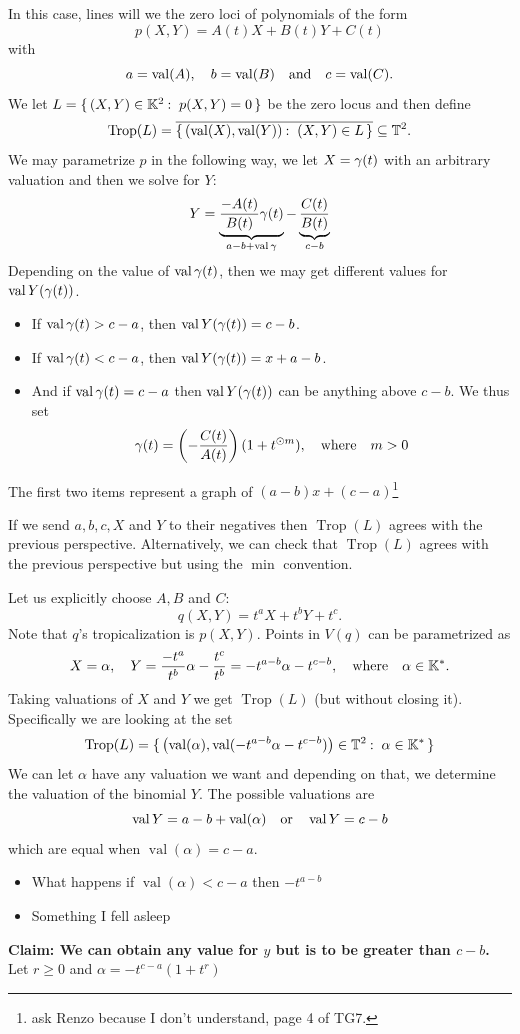 \documentclass[12pt]{memoir}
\DeclareMathOperator{\val}{val}
\DeclareMathOperator{\Trop}{Trop}
\theoremstyle{definition}
\def\al{\alpha}
\begin{document}
In this case, lines will we the zero loci of polynomials of the form 
$$p(X,Y)=A(t)X+B(t)Y+C(t)$$
with 
$$a=\val(A),\quad b=\val(B)\word{and}c=\val(C).$$
We let $L=\set{(X,Y)\in\bK^2\:\ p(X,Y)=0}$ be the zero locus and then define
$$\Trop(L)=\ov{\set{(\val(X),\val(Y))\:\ (X,Y)\in L}}\subseteq\bT^2.$$
We may parametrize $p$ in the following way, we let $X=\gamma(t)$ with an arbitrary valuation and then we solve for $Y$:
$$Y=\underbrace{\frac{-A(t)}{B(t)}\ga(t)}_{a-b+\val\ga}-\underbrace{\frac{C(t)}{B(t)}}_{c-b}$$ 
 Depending on the value of $\val\ga(t)$, then we may get different values for $\val Y(\ga(t))$. 
\begin{itemize}
    \itemsep=-0.4em 
    \item If $\val\ga(t)>c-a$, then $\val Y(\ga(t))=c-b$.
    \item If $\val\ga(t)<c-a$, then $\val Y(\ga(t))=x+a-b$.
    \item And if $\val\ga(t)=c-a$ then $\val Y(\ga(t))$ can be anything above $c-b$. We thus set 
    $$\gamma(t)=\left(-\frac{C(t)}{A(t)}\right)(1+t^{\odot m}),\quad\text{where}\quad m>0$$
\end{itemize}
The first two items represent a graph of $(a-b)x+(c-a)$\footnote{ask Renzo because I don't understand, page 4 of TG7.}
\begin{Rmk}
If we send $a,b,c,X$ and $Y$ to their negatives then $\Trop(L)$ agrees with the previous perspective. Alternatively, we can check that $\Trop(L)$ agrees with the previous perspective but using the $\min$ convention.
\end{Rmk}
\begin{Ex}
    Let us explicitly choose $A,B$ and $C$:
    $$q(X,Y)=t^aX+t^bY+t^c.$$
    Note that $q$'s tropicalization is $p(X,Y)$.
    Points in $V(q)$ can be parametrized as 
    $$X=\al,\quad Y=\frac{-t^a}{t^b}\al-\frac{t^c}{t^b}=-t^{a-b}\al-t^{c-b},\word{where}\al\in\bK^\ast.$$
    Taking valuations of $X$ and $Y$ we get $\Trop(L)$ (but without closing it). Specifically we are looking at the set 
    $$\Trop(L)=\set{\left(\val(\al),\val(-t^{a-b}\al-t^{c-b})\right)\in\bT^2\:\ \al\in\bK^\ast}$$
    We can let $\al$ have any valuation we want and depending on that, we determine the valuation of the binomial $Y$. The possible valuations are 
    $$\val Y=a-b+\val(\al)\word{or}\val Y =c-b$$
    which are equal when $\val(\al)=c-a$. 
    \begin{itemize}
        \item What happens if $\val(\al)<c-a$ then $-t^{a-b}$
        \item Something I fell asleep 
    \end{itemize}
    \textbf{Claim: We can obtain any value for $y$ but is to be greater than $c-b$.}
    Let $r\geq 0$ and $\al=-t^{c-a}(1+t^r)$
\end{Ex}
\end{document}
